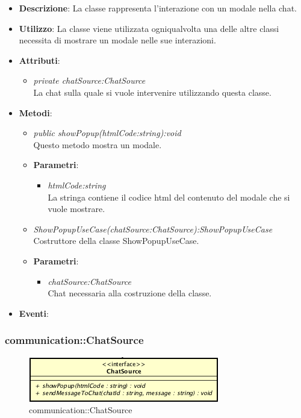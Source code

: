 \begin{itemize}
\item \textbf{Descrizione}: La classe rappresenta l'interazione con un modale nella chat.
\item \textbf{Utilizzo}: La classe viene utilizzata ogniqualvolta una delle altre classi necessita di mostrare un modale nelle sue interazioni.
\item \textbf{Attributi}: 
	\begin{itemize}
	\item \textit{private chatSource:ChatSource}\\
	La chat sulla quale si vuole intervenire utilizzando questa classe.
	\end{itemize}
\item \textbf{Metodi}:
	\begin{itemize}
	\item \textit{public showPopup(htmlCode:string):void}\\
	Questo metodo mostra un modale.
			\item{\textbf{Parametri}: \begin{itemize}
			\item \textit{htmlCode:string}\\
			La stringa contiene il codice html del contenuto del modale che si vuole mostrare.
			\end{itemize}}
	\item \textit{ShowPopupUseCase(chatSource:ChatSource):ShowPopupUseCase}\\
	Costruttore della classe ShowPopupUseCase.
		\item{\textbf{Parametri}: \begin{itemize}
		\item \textit{chatSource:ChatSource}\\
		Chat necessaria alla costruzione della classe.
		\end{itemize}}
	\end{itemize}
\item \textbf{Eventi}:
\end{itemize}

\subsubsection{communication::ChatSource}

\label{communication::ChatSource}
\begin{figure}[ht]
	\centering
	\includegraphics[scale=0.5]{Sezioni/SottosezioniST/img/app/ChatSource.png}
	\caption{communication::ChatSource}
\end{figure}

